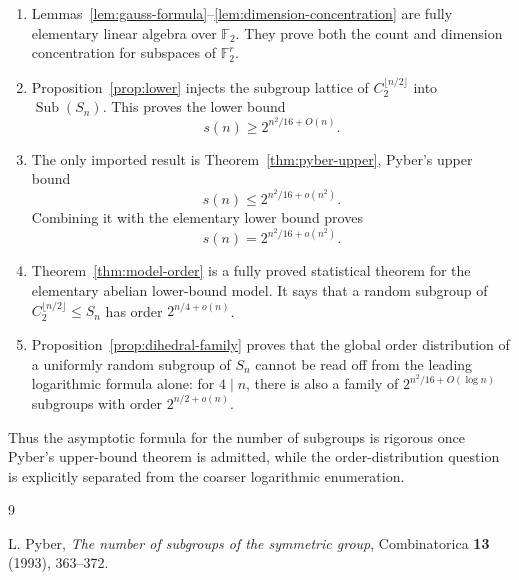 \documentclass[a4paper,11pt]{amsart}
\theoremstyle{remark}
\newcommand{\Sub}{\operatorname{Sub}}
\newcommand{\F}{\mathbb F}
\begin{document}
\begin{enumerate}[label=\textup{(\arabic*)},leftmargin=2.5em]
    \item Lemmas~\ref{lem:gauss-formula}--\ref{lem:dimension-concentration} are fully elementary
    linear algebra over \(\F_2\). They prove both the count and dimension concentration for
    subspaces of \(\F_2^r\).

    \item Proposition~\ref{prop:lower} injects the subgroup lattice of
    \(C_2^{\lfloor n/2\rfloor}\) into \(\Sub(S_n)\). This proves the lower bound
    \[
            s(n)\geq 2^{n^2/16+O(n)}.
    \]

    \item The only imported result is Theorem~\ref{thm:pyber-upper}, Pyber's upper bound
    \[
            s(n)\leq 2^{n^2/16+o(n^2)}.
    \]
    Combining it with the elementary lower bound proves
    \[
            s(n)=2^{n^2/16+o(n^2)}.
    \]

    \item Theorem~\ref{thm:model-order} is a fully proved statistical theorem for the elementary
    abelian lower-bound model. It says that a random subgroup of
    \(C_2^{\lfloor n/2\rfloor}\leq S_n\) has order \(2^{n/4+o(n)}\).

    \item Proposition~\ref{prop:dihedral-family} proves that the global order distribution of a
    uniformly random subgroup of \(S_n\) cannot be read off from the leading logarithmic formula
    alone: for \(4\mid n\), there is also a family of \(2^{n^2/16+O(\log n)}\) subgroups with order
    \(2^{n/2+o(n)}\).
\end{enumerate}

Thus the asymptotic formula for the number of subgroups is rigorous once Pyber's upper-bound
theorem is admitted, while the order-distribution question is explicitly separated from the
coarser logarithmic enumeration.

\begin{thebibliography}{9}

L. Pyber,
\emph{The number of subgroups of the symmetric group},
Combinatorica \textbf{13} (1993), 363--372.

\end{thebibliography}
\end{document}
